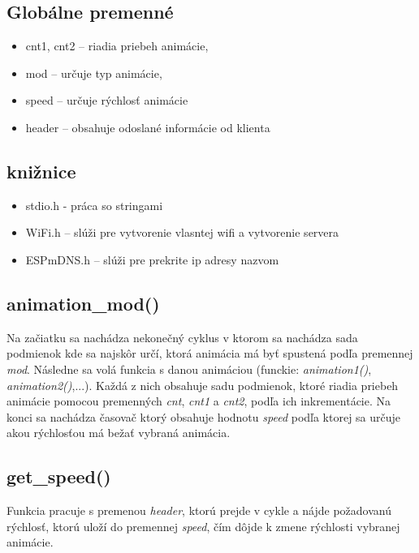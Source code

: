 \documentclass[a4paper, 11pt]{article}
\begin{document}
\subsection{Globálne premenné}
\begin{itemize}
    \item cnt1, cnt2 -- riadia priebeh animácie, 
    \item mod -- určuje typ animácie,
    \item speed -- určuje rýchlosť animácie
    \item header -- obsahuje odoslané informácie od klienta
\end{itemize}

\subsection{knižnice}
\begin{itemize}
    \item  stdio.h - práca so stringami
    \item  WiFi.h -- slúži pre vytvorenie vlasntej wifi a vytvorenie servera
    \item  ESPmDNS.h -- slúži pre prekrite ip adresy nazvom
\end{itemize}

\subsection{animation\_mod()}
Na začiatku sa nachádza nekonečný cyklus v ktorom sa nachádza sada podmienok kde sa najskôr určí, ktorá animácia má byť spustená podľa premennej \textit{mod}. Následne sa volá funkcia s danou animáciou (funckie: \textit{animation1()}, \textit{animation2()},...). Každá z nich obsahuje sadu podmienok, ktoré riadia priebeh animácie pomocou premenných \textit{cnt}, \textit{cnt1} a \textit{cnt2}, podľa ich inkrementácie. Na konci sa nachádza časovač ktorý obsahuje hodnotu \textit{speed} podľa ktorej sa určuje akou rýchlosťou má bežať vybraná animácia.

\subsection{get\_speed()}
Funkcia pracuje s premenou \textit{header}, ktorú prejde v cykle a nájde požadovanú rýchlosť, ktorú uloží do premennej \textit{speed}, čím dôjde k zmene rýchlosti vybranej animácie.
\end{document}
